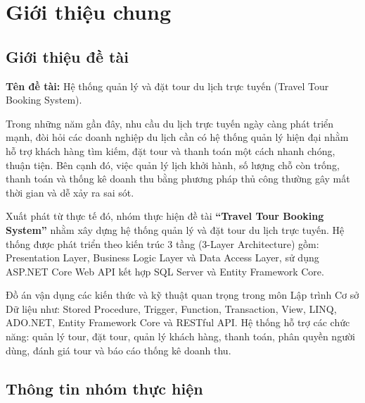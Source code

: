 
\chapter{Giới thiệu chung}

\section{Giới thiệu đề tài}

\noindent\textbf{Tên đề tài:} Hệ thống quản lý và đặt tour du lịch trực tuyến (Travel Tour Booking System).

Trong những năm gần đây, nhu cầu du lịch trực tuyến ngày càng phát triển mạnh,
đòi hỏi các doanh nghiệp du lịch cần có hệ thống quản lý hiện đại nhằm hỗ trợ
khách hàng tìm kiếm, đặt tour và thanh toán một cách nhanh chóng, thuận tiện.
Bên cạnh đó, việc quản lý lịch khởi hành, số lượng chỗ còn trống, thanh toán
và thống kê doanh thu bằng phương pháp thủ công thường gây mất thời gian và
dễ xảy ra sai sót.

Xuất phát từ thực tế đó, nhóm thực hiện đề tài
\textbf{“Travel Tour Booking System”} nhằm xây dựng hệ thống quản lý và đặt
tour du lịch trực tuyến. Hệ thống được phát triển theo kiến trúc 3 tầng
(3-Layer Architecture) gồm: Presentation Layer, Business Logic Layer và
Data Access Layer, sử dụng ASP.NET Core Web API kết hợp SQL Server và
Entity Framework Core.

Đồ án vận dụng các kiến thức và kỹ thuật quan trọng trong môn
Lập trình Cơ sở Dữ liệu như:
Stored Procedure, Trigger, Function, Transaction, View, LINQ, ADO.NET,
Entity Framework Core và RESTful API. Hệ thống hỗ trợ các chức năng:
quản lý tour, đặt tour, quản lý khách hàng, thanh toán, phân quyền người dùng,
đánh giá tour và báo cáo thống kê doanh thu.

\section{Thông tin nhóm thực hiện}

